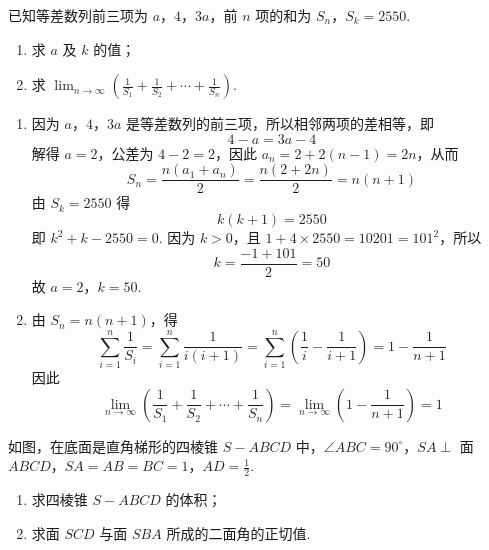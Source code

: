 \begin{problem}
已知等差数列前三项为 \(a\)，\(4\)，\(3a\)，前 \(n\) 项的和为 \(S_{n}\)，\(S_{k} = 2550\).

\begin{enumerate}
\item 求 \(a\) 及 \(k\) 的值；
\item 求 \(\displaystyle\lim_{n\to\infty}\left(\frac{1}{S_{1}}+\frac{1}{S_{2}}+\cdots+\frac{1}{S_{n}}\right)\).
\end{enumerate}
\end{problem}

\begin{solution}
\begin{enumerate}
\item 因为 \(a\)，\(4\)，\(3a\) 是等差数列的前三项，所以相邻两项的差相等，即
\[
4-a=3a-4
\]
解得 \(a=2\)，公差为 \(4-2=2\)，因此 \(a_n=2+2(n-1)=2n\)，从而
\[
S_n=\frac{n(a_1+a_n)}{2}=\frac{n(2+2n)}{2}=n(n+1)
\]
由 \(S_k=2550\) 得
\[
k(k+1)=2550
\]
即 \(k^2+k-2550=0\). 因为 \(k>0\)，且 \(1+4\times2550=10201=101^2\)，所以
\[
k=\frac{-1+101}{2}=50
\]
故 \(a=2\)，\(k=50\).
\item 由 \(S_n=n(n+1)\)，得
\[
\sum_{i=1}^{n}\frac{1}{S_i}=\sum_{i=1}^{n}\frac{1}{i(i+1)}=\sum_{i=1}^{n}\left(\frac{1}{i}-\frac{1}{i+1}\right)=1-\frac{1}{n+1}
\]
因此
\[
\displaystyle\lim_{n\to\infty}\left(\frac{1}{S_1}+\frac{1}{S_2}+\cdots+\frac{1}{S_n}\right)=\lim_{n\to\infty}\left(1-\frac{1}{n+1}\right)=1
\]
\end{enumerate}
\end{solution}

\begin{problem}
如图，在底面是直角梯形的四棱锥 \(S - ABCD\) 中，\(\angle ABC = 90^{\circ}\)，\(SA \perp\) 面 \(ABCD\)，\(SA = AB = BC = 1\)，\(AD = \frac{1}{2}\).

\begin{enumerate}
\item 求四棱锥 \(S - ABCD\) 的体积；
\item 求面 \(SCD\) 与面 \(SBA\) 所成的二面角的正切值.
\end{enumerate}

\end{problem}

